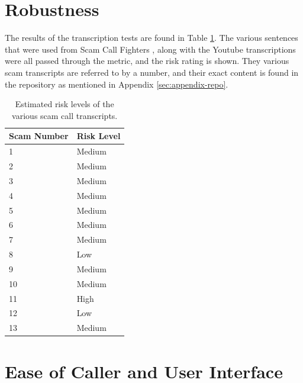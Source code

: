 \documentclass[main.tex]{subfiles}
\begin{document}
\section{Robustness}
The results of the transcription tests are found in Table \ref{tbl:robust}. The various sentences that were used from Scam Call Fighters \cite{spam-calls}, along with the Youtube transcriptions were all passed through the metric, and the risk rating is shown. They various scam transcripts are referred to by a number, and their exact content is found in the repository as mentioned in Appendix \ref{sec:appendix-repo}.

\begin{table}[h]
\centering
\begin{tabular}{|l|l|}
	\hline
\textbf{Scam Number} & \textbf{Risk Level}                                 \\\hline
1           & Medium                                                    \\
2           & Medium                                                   \\
3           & Medium                                                 \\
4           & Medium                                                 \\
5           & Medium                                                 \\
6           & Medium                                                \\
7           & Medium                                                \\
8           & Low                                                \\
9           & Medium                                                \\
10           & Medium                                                \\
11           & High                                                \\
12           & Low                                                \\
13           & Medium  \\\hline
\end{tabular}
\caption{Estimated risk levels of the various scam call transcripts. }
\label{tbl:robust}
\end{table}

\section{Ease of Caller and User Interface}
\end{document}
